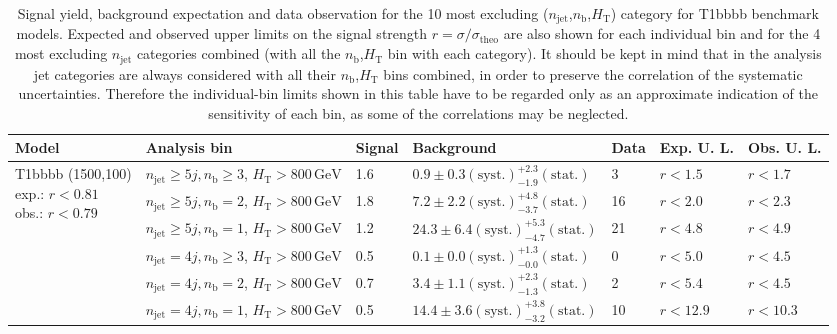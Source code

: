 \clearpage
\begin{table}[h!] 
  \scriptsize
  \caption{ 
  Signal yield, background expectation and data observation for the 10
  most excluding
  ($n_{\mathrm{jet}}$,$n_{\mathrm{b}}$,$H_{\mathrm{T}}$) category for
  T1bbbb benchmark models.  
  Expected and observed upper limits on the signal strength
  $r=\sigma/\sigma_{\mathrm{theo}}$ are also shown  
  for each individual bin and for the 4 most excluding
  $n_{\mathrm{jet}}$ categories combined (with all the
  $n_{\mathrm{b}}$,$H_{\mathrm{T}}$ bin with each category). 
  It should be kept in mind that in the analysis jet categories are
  always considered with all their $n_{\mathrm{b}}$,$H_{\mathrm{T}}$
  bins  
  combined, in order to preserve the correlation of the systematic
  uncertainties.  
  Therefore the individual-bin limits shown in this table have to be
  regarded only as an approximate indication  
  of the sensitivity of each bin, as some of the correlations may be
  neglected. 
  \label{tab:sigBenchmarksYields_T1bbbb}}
  \centering 
  \begin{tabular}{ lllllll } 
    \hline 
    Model & Analysis bin & Signal & Background & Data & Exp. U. L. & Obs. U. L. \\ \hline
\multirow{10}{*}{\parbox[t]{2cm}{T1bbbb (1500,100)\\exp.: $r<0.81$\\obs.: $r<0.79$}}
 & $n_{\mathrm{jet}} \geq5j,n_{\mathrm{b}} \geq3$, $H_{\mathrm{T}} > 800 \, \mathrm{GeV}$ & 1.6 & $0.9 \pm 0.3 \mathrm{(syst.)} ^{+2.3}_{-1.9} \mathrm{(stat.)}$ & 3 & $r < 1.5$ & $r < 1.7$\\ 
 & $n_{\mathrm{jet}} \geq5j,n_{\mathrm{b}} =2$, $H_{\mathrm{T}} > 800 \, \mathrm{GeV}$ & 1.8 & $7.2 \pm 2.2 \mathrm{(syst.)} ^{+4.8}_{-3.7} \mathrm{(stat.)}$ & 16 & $r < 2.0$ & $r < 2.3$\\ 
 & $n_{\mathrm{jet}} \geq5j,n_{\mathrm{b}} =1$, $H_{\mathrm{T}} > 800 \, \mathrm{GeV}$ & 1.2 & $24.3 \pm 6.4 \mathrm{(syst.)} ^{+5.3}_{-4.7} \mathrm{(stat.)}$ & 21 & $r < 4.8$ & $r < 4.9$\\ 
 & $n_{\mathrm{jet}} =4j,n_{\mathrm{b}} \geq3$, $H_{\mathrm{T}} > 800 \, \mathrm{GeV}$ & 0.5 & $0.1 \pm 0.0 \mathrm{(syst.)} ^{+1.3}_{-0.0} \mathrm{(stat.)}$ & 0 & $r < 5.0$ & $r < 4.5$\\ 
 & $n_{\mathrm{jet}} =4j,n_{\mathrm{b}} =2$, $H_{\mathrm{T}} > 800 \, \mathrm{GeV}$ & 0.7 & $3.4 \pm 1.1 \mathrm{(syst.)} ^{+2.3}_{-1.3} \mathrm{(stat.)}$ & 2 & $r < 5.4$ & $r < 4.5$\\ 
 & $n_{\mathrm{jet}} =4j,n_{\mathrm{b}} =1$, $H_{\mathrm{T}} > 800 \, \mathrm{GeV}$ & 0.5 & $14.4 \pm 3.6 \mathrm{(syst.)} ^{+3.8}_{-3.2} \mathrm{(stat.)}$ & 10 & $r < 12.9$ & $r < 10.3$\\ 

\end{tabular}
\end{table}
